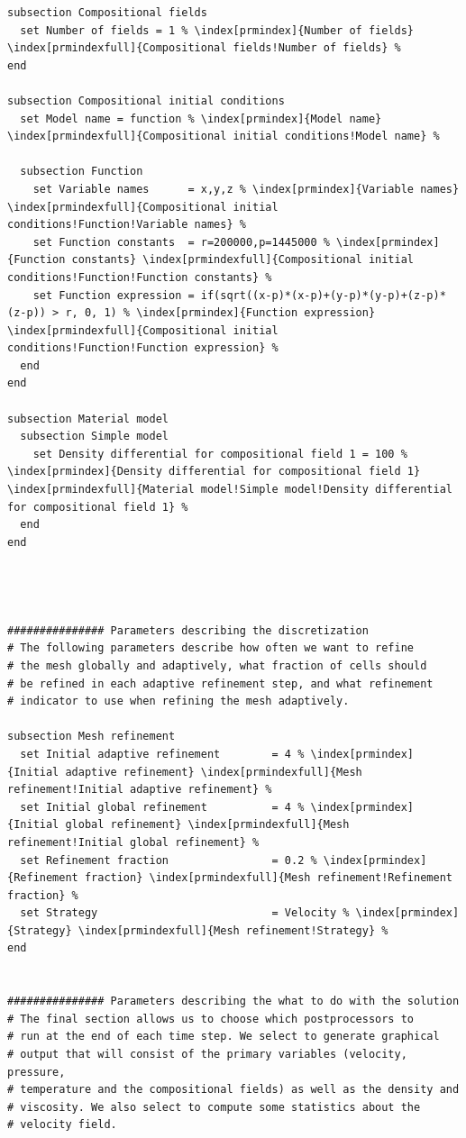 \documentclass{article}
\begin{document}
\begin{lstlisting}[frame=single,language=prmfile,escapechar=\%]
subsection Compositional fields
  set Number of fields = 1 % \index[prmindex]{Number of fields} \index[prmindexfull]{Compositional fields!Number of fields} %
end

subsection Compositional initial conditions
  set Model name = function % \index[prmindex]{Model name} \index[prmindexfull]{Compositional initial conditions!Model name} %

  subsection Function
    set Variable names      = x,y,z % \index[prmindex]{Variable names} \index[prmindexfull]{Compositional initial conditions!Function!Variable names} %
    set Function constants  = r=200000,p=1445000 % \index[prmindex]{Function constants} \index[prmindexfull]{Compositional initial conditions!Function!Function constants} %
    set Function expression = if(sqrt((x-p)*(x-p)+(y-p)*(y-p)+(z-p)*(z-p)) > r, 0, 1) % \index[prmindex]{Function expression} \index[prmindexfull]{Compositional initial conditions!Function!Function expression} %
  end
end

subsection Material model
  subsection Simple model
    set Density differential for compositional field 1 = 100 % \index[prmindex]{Density differential for compositional field 1} \index[prmindexfull]{Material model!Simple model!Density differential for compositional field 1} %
  end
end




############### Parameters describing the discretization
# The following parameters describe how often we want to refine
# the mesh globally and adaptively, what fraction of cells should
# be refined in each adaptive refinement step, and what refinement
# indicator to use when refining the mesh adaptively.

subsection Mesh refinement
  set Initial adaptive refinement        = 4 % \index[prmindex]{Initial adaptive refinement} \index[prmindexfull]{Mesh refinement!Initial adaptive refinement} %
  set Initial global refinement          = 4 % \index[prmindex]{Initial global refinement} \index[prmindexfull]{Mesh refinement!Initial global refinement} %
  set Refinement fraction                = 0.2 % \index[prmindex]{Refinement fraction} \index[prmindexfull]{Mesh refinement!Refinement fraction} %
  set Strategy                           = Velocity % \index[prmindex]{Strategy} \index[prmindexfull]{Mesh refinement!Strategy} %
end


############### Parameters describing the what to do with the solution
# The final section allows us to choose which postprocessors to
# run at the end of each time step. We select to generate graphical
# output that will consist of the primary variables (velocity, pressure,
# temperature and the compositional fields) as well as the density and
# viscosity. We also select to compute some statistics about the
# velocity field.


\end{lstlisting}
\end{document}
